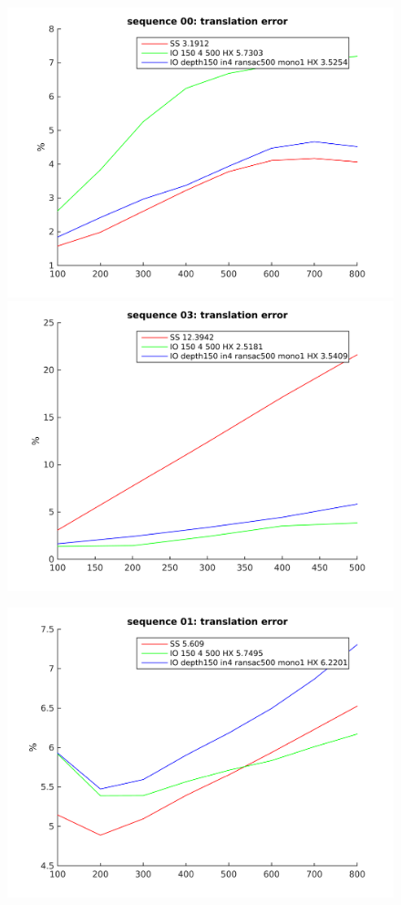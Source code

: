 \documentclass[runningheads]{llncs}
\begin{document}
\begin{figure}
  \begin{minipage}[t]{.3\linewidth}
    \centering
    \includegraphics[width=\textwidth]{translation_error_00}
    \includegraphics[width=\textwidth]{translation_error_03}
  \end{minipage}
  \begin{minipage}[t]{.3\linewidth}
    \centering
    \includegraphics[width=\textwidth]{translation_error_01}

\end{minipage}
\end{figure}
\end{document}
